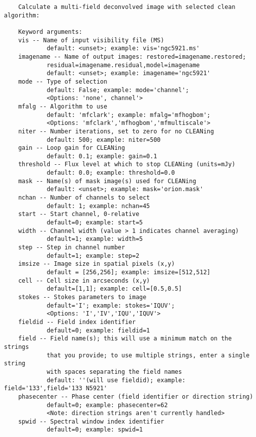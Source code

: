 \normalsize

\vspace{3mm}
\small
\begin{verbatim}
    Calculate a multi-field deconvolved image with selected clean algorithm:
    
    Keyword arguments:
    vis -- Name of input visibility file (MS)
            default: <unset>; example: vis='ngc5921.ms'
    imagename -- Name of output images: restored=imagename.restored;
            residual=imagename.residual,model=imagename
            default: <unset>; example: imagename='ngc5921'
    mode -- Type of selection 
            default: False; example: mode='channel'; 
            <Options: 'none', channel'>
    mfalg -- Algorithm to use
            default: 'mfclark'; example: mfalg='mfhogbom'; 
            <Options: 'mfclark','mfhogbom','mfmultiscale'>
    niter -- Number iterations, set to zero for no CLEANing
            default: 500; example: niter=500
    gain -- Loop gain for CLEANing
            default: 0.1; example: gain=0.1
    threshold -- Flux level at which to stop CLEANing (units=mJy)
            default: 0.0; example: threshold=0.0
    mask -- Name(s) of mask image(s) used for CLEANing
            default: <unset>; example: mask='orion.mask'
    nchan -- Number of channels to select
            default: 1; example: nchan=45
    start -- Start channel, 0-relative
            default=0; example: start=5
    width -- Channel width (value > 1 indicates channel averaging)
            default=1; example: width=5
    step -- Step in channel number
            default=1; example: step=2      
    imsize -- Image size in spatial pixels (x,y)
            default = [256,256]; example: imsize=[512,512]
    cell -- Cell size in arcseconds (x,y)
            default=[1,1]; example: cell=[0.5,0.5]
    stokes -- Stokes parameters to image
            default='I'; example: stokes='IQUV'; 
            <Options: 'I','IV','IQU','IQUV'>
    fieldid -- Field index identifier
            default=0; example: fieldid=1
    field -- Field name(s); this will use a minimum match on the strings
            that you provide; to use multiple strings, enter a single string
            with spaces separating the field names
            default: ''(will use fieldid); example: field='133',field='133 N5921'
    phasecenter -- Phase center (field identifier or direction string)
            default=0; example: phasecenter=62
            <Note: direction strings aren't currently handled>
    spwid -- Spectral window index identifier
            default=0; example: spwid=1

\end{verbatim}
